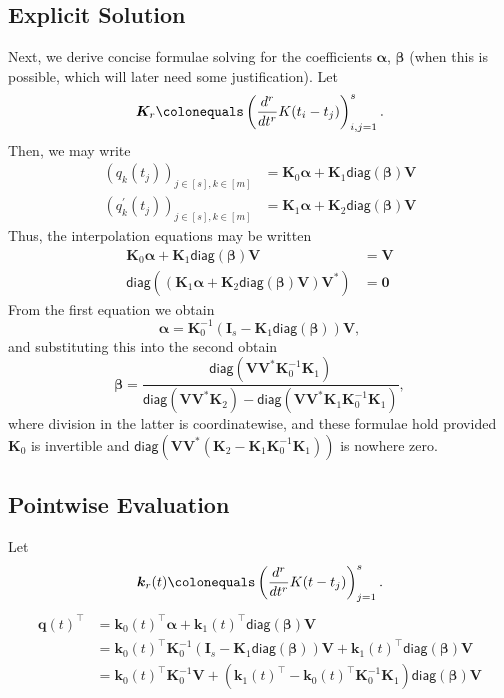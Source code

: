 \documentclass[11pt]{article}
\newcommand{\diag}{\mathsf{diag}}
\newcommand{\balpha}{\bm \alpha}
\newcommand{\bbeta}{\bm \beta}
\newcommand{\bK}{\bm K}
\newcommand{\bV}{\bm V}
\begin{document}
\subsection{Explicit Solution}

Next, we derive concise formulae solving for the coefficients $\bm \alpha$, $\bm \beta$ (when this is possible, which will later need some justification).
Let
\begin{equation}
    \bK_r \colonequals \left(\frac{d^r}{dt^r}K(t_i - t_j)\right)_{i, j = 1}^s.
\end{equation}
Then, we may write
\begin{align}
  (q_k(t_j))_{j \in [s], k \in [m]} &= \bK_0 \balpha + \bK_1\diag(\bbeta) \bV \\
  (q_k^\prime(t_j))_{j \in [s], k \in [m]} &= \bK_1 \balpha + \bK_2\diag(\bbeta) \bV
\end{align}
Thus, the interpolation equations may be written
\begin{align}
  \bK_0 \balpha + \bK_1\diag(\bbeta) \bV &= \bV \\
  \diag((\bK_1 \balpha + \bK_2\diag(\bbeta) \bV)\bV^*) &= \bm 0
\end{align}
From the first equation we obtain
\begin{equation}
    \balpha = \bK_0^{-1}(\bm I_s - \bK_1 \diag(\bbeta))\bV,
\end{equation}
and substituting this into the second obtain
\begin{equation}
    \bbeta = \frac{\diag(\bV\bV^*\bK_0^{-1}\bK_1)}{\diag(\bV\bV^*\bK_2) - \diag(\bV\bV^*\bK_1\bK_0^{-1}\bK_1)},
\end{equation}
where division in the latter is coordinatewise, and these formulae hold provided $\bK_0$ is invertible and $\diag(\bV\bV^*(\bK_2 - \bK_1\bK_0^{-1}\bK_1))$ is nowhere zero.

\subsection{Pointwise Evaluation}
Let
\begin{equation}
    \bm k_r(t) \colonequals \left(\frac{d^r}{dt^r}K(t - t_j)\right)_{j = 1}^s.
\end{equation}
\begin{align}
  \bm q(t)^\top
  &= \bm k_0(t)^\top \bm\alpha + \bm k_1(t)^\top \diag(\bm\beta) \bV \\
  &= \bm k_0(t)^\top \bK_0^{-1}(\bm I_s - \bK_1 \diag(\bm\beta))\bV + \bm k_1(t)^\top \diag(\bm\beta) \bV \\
  &= \bm k_0(t)^\top \bK_0^{-1}\bV + \left(\bm k_1(t)^\top - \bm k_0(t)^\top \bK_0^{-1}\bK_1\right)\diag(\bm\beta) \bV
\end{align}
\end{document}
